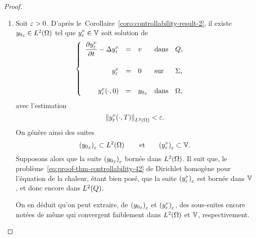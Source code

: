 \begin{proof}%
    \begin{enumerate}
        \item Soit $\varepsilon > 0$. D'après
            le~Corollaire~\ref{coro:controllability-result-2}, il existe
            ${y_{0}}_{\varepsilon}\in L^{2}\!\left({\Omega}\right)$ tel que $\displaystyle
            y_{\varepsilon}^{v}\in \mathbb{V}$ soit solution de
            \begin{equation}\label{eq:proof-thm-controllability-42}
                \begin{cases}\displaystyle
                    \begin{array}{rclll}
                        \dfrac{\partial{}y_{\varepsilon}^{v}}{\partial{}t} - \Delta y_{\varepsilon}^{v} &
                        = & v & \text{dans} & Q,\\
                        \\
                        y_{\varepsilon}^{v} & = & 0 & \text{sur} & \Sigma,\\
                        \\
                        y_{\varepsilon}^{v}\!\left({\cdot,0}\right) & = &
                        {y_{0}}_{\varepsilon} & \text{dans} & \Omega,
                    \end{array}
                \end{cases}
            \end{equation}
            avec l'estimation
            \begin{equation*}\label{eq:proof-thm-controllability-43}
                {\left\|{y_{\varepsilon}^{v}\!\left({\cdot, T}\right) }\right\|}_{L^{2}\left({\Omega}\right)} < \varepsilon.
            \end{equation*}
            On génère ainsi des suites
            \begin{equation*}
                {\left({{y_{0}}_{\varepsilon}}\right)}_{\varepsilon}\subset
                L^{2}\!\left({\Omega}\right)\qquad\text{et}\qquad
                {\left({y_{\varepsilon}^{v}}\right)}_{\varepsilon}\subset \mathbb{V}.
            \end{equation*}
            Supposons alors que la suite
            ${\left({{y_{0}}_{\varepsilon}}\right)}_{\varepsilon}$ bornée dans
            $L^{2}\!\left({\Omega}\right)$. Il suit que, le
            problème~\eqref{eq:proof-thm-controllability-42} de Dirichlet
            homogène pour l'équation de la chaleur, étant bien posé, que la
            suite ${\left({y_{\varepsilon}^{v}}\right)}_{\varepsilon}$ est bornée dans
            $\mathbb{V}$, et donc encore dans $L^{2}\!\left({Q}\right)$.

            On en déduit qu'on peut extraire, de
            ${\left({{y_{0}}_{\varepsilon}}\right)}_{\varepsilon}$ et
            ${\left({y_{\varepsilon}^{v}}\right)}_{\varepsilon}$, des sous-suites
            encore notées de même qui convergent faiblement dans
            $L^{2}\!\left({\Omega}\right)$ et $\mathbb{V}$, respectivement.


\end{enumerate}
\end{proof}
